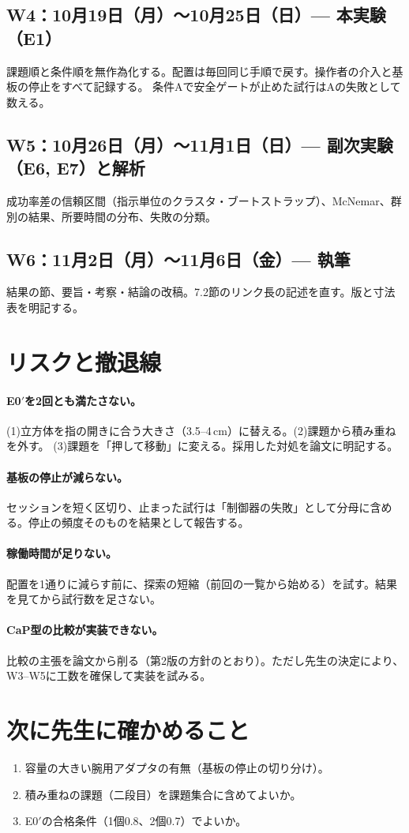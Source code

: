 \documentclass[11pt,a4paper]{article}
\begin{document}
\subsection*{W4：10月19日（月）〜10月25日（日）— 本実験（E1）}
課題順と条件順を無作為化する。配置は毎回同じ手順で戻す。操作者の介入と基板の停止をすべて記録する。
条件Aで安全ゲートが止めた試行はAの失敗として数える。

\subsection*{W5：10月26日（月）〜11月1日（日）— 副次実験（E6, E7）と解析}
成功率差の信頼区間（指示単位のクラスタ・ブートストラップ）、McNemar、群別の結果、所要時間の分布、失敗の分類。

\subsection*{W6：11月2日（月）〜11月6日（金）— 執筆}
結果の節、要旨・考察・結論の改稿。7.2節のリンク長の記述を直す。版と寸法表を明記する。

\section{リスクと撤退線}

\paragraph{E0$'$を2回とも満たさない。}(1)立方体を指の開きに合う大きさ（3.5--4\,cm）に替える。(2)課題から積み重ねを外す。
(3)課題を「押して移動」に変える。採用した対処を論文に明記する。

\paragraph{基板の停止が減らない。}セッションを短く区切り、止まった試行は「制御器の失敗」として分母に含める。停止の頻度そのものを結果として報告する。

\paragraph{稼働時間が足りない。}配置を1通りに減らす前に、探索の短縮（前回の一覧から始める）を試す。結果を見てから試行数を足さない。

\paragraph{CaP型の比較が実装できない。}比較の主張を論文から削る（第2版の方針のとおり）。ただし先生の決定により、W3--W5に工数を確保して実装を試みる。

\section{次に先生に確かめること}
\begin{enumerate}
\item 容量の大きい腕用アダプタの有無（基板の停止の切り分け）。
\item 積み重ねの課題（二段目）を課題集合に含めてよいか。
\item E0$'$の合格条件（1個0.8、2個0.7）でよいか。
\end{enumerate}
\end{document}
